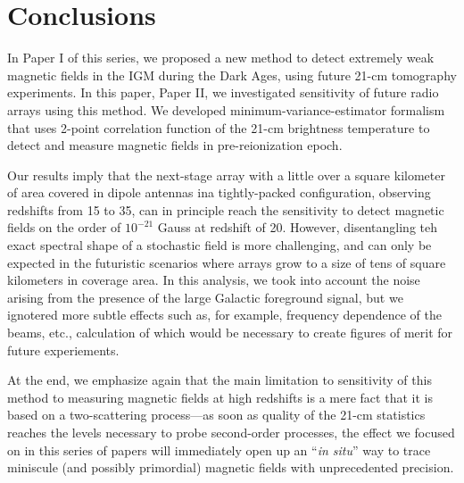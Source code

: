 \section{Conclusions}
\label{sec:conclusions}

In Paper I of this series, we proposed a new method to detect extremely weak magnetic fields in the IGM during the Dark Ages, using future 21-cm tomography experiments. In this paper, Paper II, we investigated sensitivity of future radio arrays using this method. We developed minimum-variance-estimator formalism that uses 2-point correlation function of the 21-cm brightness temperature to detect and measure magnetic fields in pre-reionization epoch. 

Our results imply that the next-stage array with a little over a square kilometer of area covered in dipole antennas ina  tightly-packed configuration, observing redshifts from 15 to 35, can in principle reach the sensitivity to detect magnetic fields on the order of $10^{-21}$ Gauss at redshift of 20. However, disentangling teh exact spectral shape of a stochastic field is more challenging, and can only be expected in the futuristic scenarios where arrays grow to a size of tens of square kilometers in coverage area. In this analysis, we took into account the noise arising from the presence of the large Galactic foreground signal, but we ignotered more subtle effects such as, for example, frequency dependence of the beams, etc., calculation of which would be necessary to create figures of merit for future experiements. 

At the end, we emphasize again that the main limitation to sensitivity of this method to measuring magnetic fields at high redshifts is a mere fact that it is based on a two-scattering process---as soon as quality of the 21-cm statistics reaches the levels necessary to probe second-order processes, the effect we focused on in this series of papers will immediately open up an ``\textit{in situ}'' way to trace miniscule (and possibly primordial) magnetic fields with unprecedented precision. 

  